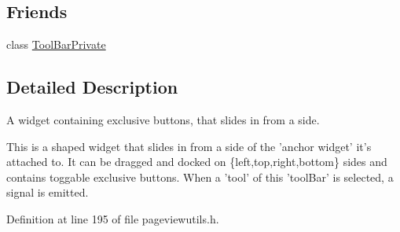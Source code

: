 \subsection*{Friends}
\begin{DoxyCompactItemize}
\item 
class \hyperlink{classPageViewToolBar_ab7e46ef179a15868ff7dccbdf8e642f2}{Tool\+Bar\+Private}
\end{DoxyCompactItemize}


\subsection{Detailed Description}
A widget containing exclusive buttons, that slides in from a side. 

This is a shaped widget that slides in from a side of the 'anchor widget' it's attached to. It can be dragged and docked on \{left,top,right,bottom\} sides and contains toggable exclusive buttons. When a 'tool' of this 'tool\+Bar' is selected, a signal is emitted. 

Definition at line 195 of file pageviewutils.\+h.



